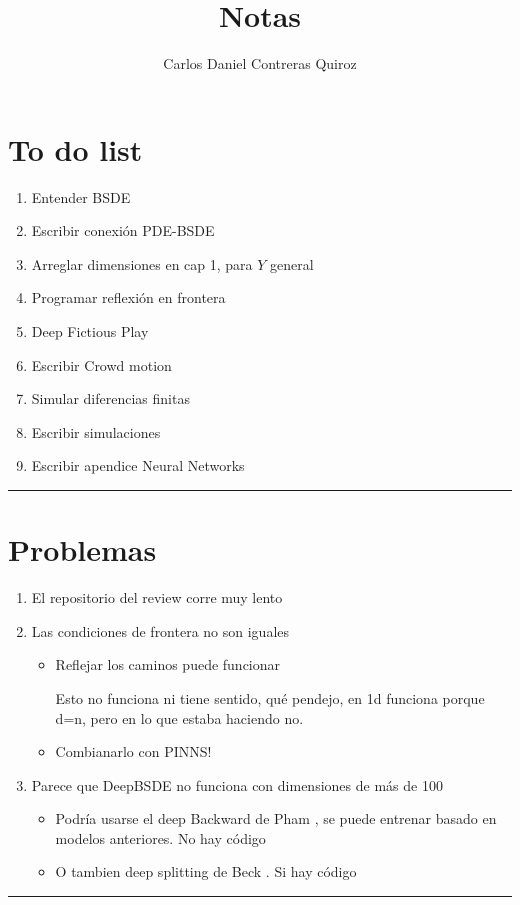 \documentclass{article}
\title{Notas}
\author{Carlos Daniel Contreras Quiroz}
\newcommand{\HRule}{\rule{\linewidth}{0.5mm}}
\begin{document}
	\maketitle%
	\vspace{5mm}
	\section*{To do list}
	\begin{enumerate}
		\item Entender BSDE \greencheck
		\item Escribir conexión PDE-BSDE
		\item Arreglar dimensiones en cap 1, para $Y$ general
		\item Programar reflexión en frontera
		\item Deep Fictious Play
		\item Escribir Crowd motion
		\item Simular diferencias finitas
		\item Escribir simulaciones
		\item Escribir apendice Neural Networks
	\end{enumerate}
    \HRule\par
	\section*{Problemas}
	\begin{enumerate}
		\item El repositorio del review corre muy lento \bluecheck
		\item Las condiciones de frontera no son iguales
		\begin{itemize}
			\item Reflejar los caminos puede funcionar \redwrong 
			
			Esto no funciona ni tiene sentido, qué pendejo, en 1d funciona porque d=n, pero en lo que estaba haciendo no.
			\item Combianarlo con PINNS!
		\end{itemize}
		\item Parece que DeepBSDE no funciona con dimensiones de más de 100
		\begin{itemize}
			\item Podría usarse el deep Backward de Pham \cite{hure_deep_2020}, se puede entrenar basado en modelos anteriores. No hay código
			\item O tambien deep splitting de Beck \cite{beck_deep_2021}. Si hay código
		\end{itemize}
	\end{enumerate}
    \HRule\par
\end{document}
